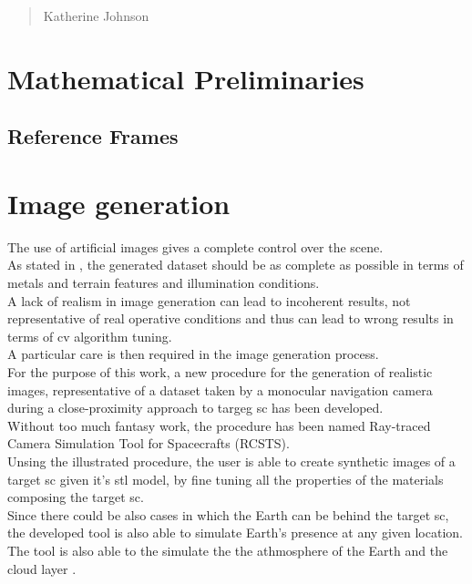 \begin{quotation}
{\footnotesize
{}
\begin{flushright}
Katherine Johnson
\end{flushright}
}
\end{quotation}
\vspace{0.5cm}

\section{Mathematical Preliminaries}

\subsection{Reference Frames}

\section{Image generation}
The use of artificial images gives a complete control over the scene.\\
As stated in \cite{paolocorti}, the generated dataset should be as complete as possible in terms of metals and terrain features and illumination conditions.\\
A lack of realism in image generation can lead to incoherent results, not representative of real operative conditions and thus can lead to wrong results in terms of \acrshort{cv} algorithm tuning.\\
A particular care is then required in the image generation process.\\
For the purpose of this work, a new procedure for the generation of realistic images, representative of a dataset taken by a monocular navigation camera during a close-proximity approach to targeg \acrshort{sc} has been developed.\\
Without too much fantasy work, the procedure has been named Ray-traced Camera Simulation Tool for Spacecrafts (RCSTS).\\
Unsing the illustrated procedure, the user is able to create synthetic images of a target \acrshort{sc} given it's \acrshort{stl} model, by fine tuning all the properties of the materials composing the target \acrshort{sc}.\\
Since there could be also cases in which the Earth can be behind the target \acrshort{sc}, the developed tool is also able to simulate Earth's presence at any given location. The tool is also able to the simulate the the athmosphere of the Earth and the cloud layer \cite{jacopo}.\\

